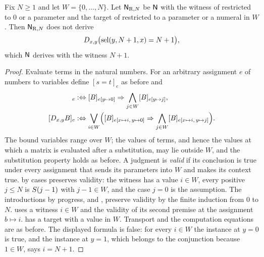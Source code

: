\begin{theorem}
\label{wit:thm:finite-range-general}
Fix $N\ge 1$ and let $W=\{0,\dots,N\}$.  Let $\mathsf{N}_{\mathrm R,N}$ be $\mathsf{N}$
with the witness of  restricted to $0$ or a parameter and the
target of  restricted to a parameter or a numeral in $W$.
Then $\mathsf{N}_{\mathrm R,N}$ does not derive
\[
 D_{x,y}\bigl(\operatorname{sel}(y,N+1,x)=N+1\bigr),
\]
which $\mathsf{N}$ derives with the witness $N+1$.
\end{theorem}

\begin{proof}
Evaluate terms in the natural numbers.  For an arbitrary assignment $e$ of
numbers to variables define $[s=t]_e$ as before and
\begin{align*}
 [\Q{y}B]_e &\iffdef [B]_{e[y\mapsto 0]}\Rightarrow
   \bigwedge_{j\in W}[B]_{e[y\mapsto j]},\\
 [\D{x}{y}B]_e &\iffdef \bigvee_{i\in W}\Bigl([B]_{e[x\mapsto i,\,y\mapsto 0]}
   \Rightarrow\bigwedge_{j\in W}[B]_{e[x\mapsto i,\,y\mapsto j]}\Bigr).
\end{align*}
The bound variables range over $W$; the values of terms, and hence the
values at which a matrix is evaluated after a substitution, may lie outside
$W$, and the substitution property holds as before.  A judgment is
\emph{valid} if its conclusion is true under every assignment that sends
its parameters into $W$ and makes its context true.   by cases
preserves validity: the witness has a value
$i\in W$, every positive $j\le N$ is $S(j-1)$ with $j-1\in W$, and the
case $j=0$ is the assumption.  The introductions by progress, and
, preserve validity by the finite induction from $0$ to $N$.
 uses a witness $i\in W$ and the validity of its second premise
at the assignment $b\mapsto i$.   has a target with a value in
$W$.  Transport and the computation equations are as before.  The displayed
formula is false: for every $i\in W$ the instance at $y=0$ is true, and the
instance at $y=1$, which belongs to the conjunction because $1\in W$, says
$i=N+1$.
\end{proof}

